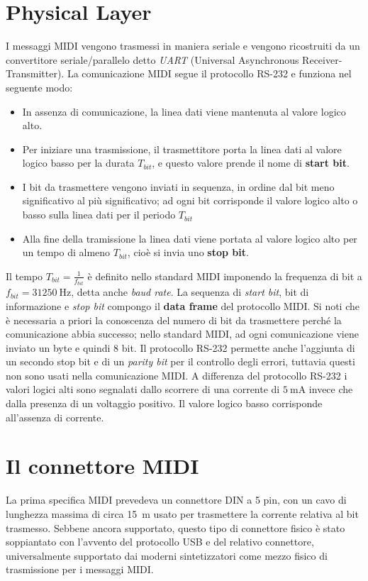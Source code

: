 \section{Physical Layer}
I messaggi MIDI vengono trasmessi in maniera seriale e vengono ricostruiti da un convertitore seriale/parallelo detto \textit{UART} (Universal Asynchronous Receiver-Transmitter).
La comunicazione MIDI segue il protocollo RS-232 e funziona nel seguente modo:
\begin{itemize}
	\item In assenza di comunicazione, la linea dati viene mantenuta al valore logico alto.
	\item Per iniziare una trasmissione, il trasmettitore porta la linea dati al valore logico basso per la durata $T_{bit}$, e questo valore prende il nome di \textbf{start bit}.
	\item I bit da trasmettere vengono inviati in sequenza, in ordine dal bit meno significativo al più significativo; ad ogni bit corrisponde il valore logico alto o basso sulla linea dati per il periodo $T_{bit}$
	\item Alla fine della tramissione la linea dati viene portata al valore logico alto per un tempo di almeno $T_{bit}$, cioè si invia uno \textbf{stop bit}.
\end{itemize}
Il tempo $T_{bit} = \frac{1}{f_{bit}}$ è definito nello standard MIDI imponendo la frequenza di bit a $f_{bit} = \SI{31250}{\hertz}$, detta anche
\textit{baud rate}.
La sequenza di \textit{start bit}, bit di informazione e \textit{stop bit} compongo il \textbf{data frame} del protocollo MIDI.
Si noti che è necessaria a priori la conoscenza del numero di bit da trasmettere perché la comunicazione abbia successo; nello standard MIDI, ad ogni comunicazione viene inviato un byte e quindi 8 bit.
Il protocollo RS-232 permette anche l'aggiunta di un secondo stop bit e di un \textit{parity bit} per il controllo degli errori, tuttavia questi non sono usati nella comunicazione MIDI.
A differenza del protocollo RS-232 i valori logici alti sono segnalati dallo scorrere di una corrente di $\SI{5}{\milli\ampere}$ invece che dalla presenza di un voltaggio positivo.
Il valore logico basso corrisponde all'assenza di corrente.

\section{Il connettore MIDI}
La prima specifica MIDI prevedeva un connettore DIN a 5 pin, 
con un cavo di lunghezza massima di circa \SI{15}{\meter} usato per trasmettere
la corrente relativa al bit trasmesso.
Sebbene ancora supportato, questo tipo di connettore fisico è stato
soppiantato con l'avvento del protocollo USB e del relativo connettore,
universalmente supportato dai moderni sintetizzatori come mezzo fisico
di trasmissione per i messaggi MIDI.

